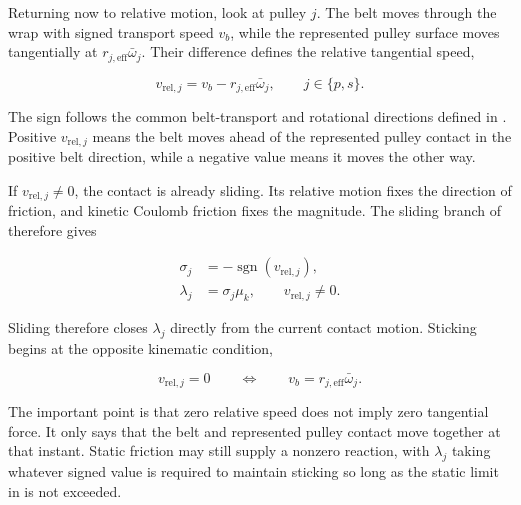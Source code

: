 \documentclass[11pt]{report}
\numberwithin{equation}{section}
\begin{document}
Returning now to relative motion, look at pulley \(j\). The belt moves through
the wrap with signed transport speed \(v_b\), while the represented pulley surface 
moves tangentially at \(r_{j,\mathrm{eff}}\bar\omega_j\). Their difference defines 
the relative tangential speed,

\begin{equation}
    v_{\mathrm{rel},j}
    =
    v_b-r_{j,\mathrm{eff}}\bar\omega_j,
    \qquad
    j\in\{p,s\}.
\label{eq:tangential_relative_speed}
\end{equation}

The sign follows the common belt-transport and rotational directions defined
in . Positive \(v_{\mathrm{rel},j}\) means the belt
moves ahead of the represented pulley contact in the positive belt direction,
while a negative value means it moves the other way.

If \(v_{\mathrm{rel},j}\neq0\), the contact is already sliding. Its relative
motion fixes the direction of friction, and kinetic Coulomb friction fixes the
magnitude. The sliding branch of  therefore
gives

\begin{equation}
\begin{aligned}
    \sigma_j
    &=
    -\operatorname{sgn}\!\left(v_{\mathrm{rel},j}\right),
    \\
    \lambda_j
    &=
    \sigma_j\mu_k,
    \qquad
    v_{\mathrm{rel},j}\neq0.
\end{aligned}
\label{eq:sliding_traction_utilization}
\end{equation}

Sliding therefore closes \(\lambda_j\) directly from the current contact
motion. Sticking begins at the opposite kinematic condition,

\begin{equation}
    v_{\mathrm{rel},j}=0
    \qquad\Longleftrightarrow\qquad
    v_b=r_{j,\mathrm{eff}}\bar\omega_j.
\label{eq:sticking_velocity_compatibility}
\end{equation}

The important point is that zero relative speed does not imply zero tangential
force. It only says that the belt and represented pulley contact move together
at that instant. Static friction may still supply a nonzero reaction, with
\(\lambda_j\) taking whatever signed value is required to maintain sticking
so long as the static limit in  is not
exceeded.
\end{document}

